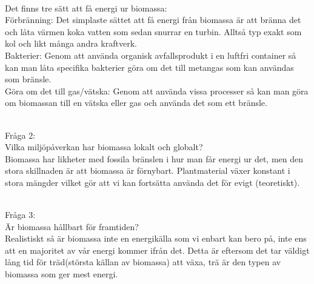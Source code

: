 \documentclass[11p]{article}
\begin{document}
    \\Det finns tre sätt att få energi ur biomassa:
    \\Förbränning: Det simplaste sättet att få energi från biomassa är att bränna det och låta värmen koka vatten som sedan snurrar en turbin. Alltså typ exakt som kol och likt många andra kraftverk.
    \\Bakterier: Genom att använda organisk avfallsprodukt i en luftfri container så kan man låta specifika bakterier göra om det till metangas som kan användas som bränsle.
    \\Göra om det till gas/vätska: Genom att använda vissa processer så kan man göra om biomassan till en vätska eller gas och använda det som ett bränsle.

    \\  Fråga 2:
    \\Vilka miljöpåverkan har biomassa lokalt och globalt?
    \\ Biomassa har likheter med fossila bränslen i hur man får energi ur det, men den stora skillnaden är att biomassa är förnybart. Plantmaterial växer konstant i stora mängder vilket gör att vi kan fortsätta använda det för evigt (teoretiskt).


    \\ Fråga 3:
    \\Är biomassa hållbart för framtiden?
    \\ Realistiskt så är biomassa inte en energikälla som vi enbart kan bero på, inte ens att en majoritet av vår energi kommer ifrån det. Detta är eftersom det tar väldigt lång tid för träd(största källan av biomassa) att växa, trä är den typen av biomassa som ger mest energi.
\end{document}
